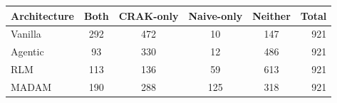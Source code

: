 \begin{tabular}{@{}lccccr@{}}
\toprule
\textbf{Architecture} & \textbf{Both} & \textbf{CRAK-only} & \textbf{Naive-only} & \textbf{Neither} & \textbf{Total} \\
\midrule
Vanilla & 292 & 472 & 10 & 147 & 921 \\
Agentic & 93 & 330 & 12 & 486 & 921 \\
RLM & 113 & 136 & 59 & 613 & 921 \\
MADAM & 190 & 288 & 125 & 318 & 921 \\
\bottomrule
\end{tabular}